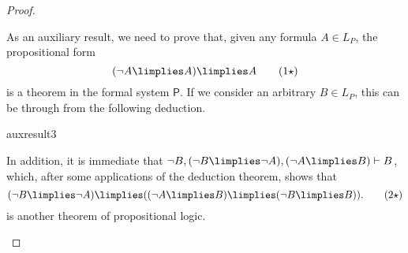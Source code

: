 \begin{proof}
\begin{parlist}
\item As an auxiliary result, we need to prove that, given any formula $A\in L_P$,  the propositional form
\begin{equation}
(\lnot A \limplies A) \limplies A
\tag{$1\star$}
\label{prelp41}
\end{equation}
is a theorem in the formal system $\mathsf{P}$. If we consider an arbitrary $B \in L_P$, this can be through from the following deduction.
\begin{deduction}{auxresult3}
\end{deduction}

In addition, it is immediate that $\lnot B, (\lnot B \limplies \lnot A), (\lnot A \limplies B) \vdash B$, which, after some applications of the deduction theorem, shows that
\begin{equation}
(\lnot B \limplies \lnot A) \limplies ( (\lnot A \limplies B) \limplies (\lnot B \limplies B)).
\tag{$2\star$}
\label{prelp42}
\end{equation}
is another theorem of propositional logic.


\end{parlist}
\end{proof}
